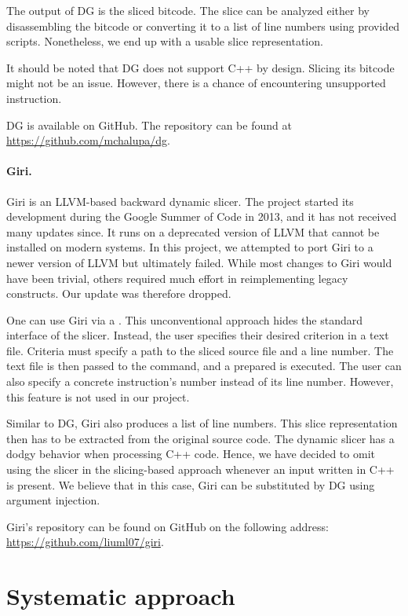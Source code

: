 The output of DG is the sliced bitcode. 
The slice can be analyzed either by disassembling the bitcode or converting 
it to a list of line numbers using provided scripts. 
Nonetheless, we end up with a usable slice representation.

It should be noted that DG does not support C++ by design. 
Slicing its bitcode might not be an issue. 
However, there is a chance of encountering unsupported instruction.

DG is available on GitHub. 
The repository can be found at \url{https://github.com/mchalupa/dg}.

\paragraph{Giri.}

Giri is an LLVM-based backward dynamic slicer. 
The project started its development during the Google Summer of Code in 2013, 
and it has not received many updates since. 
It runs on a deprecated version of LLVM that cannot be installed on modern 
systems. 
In this project, we attempted to port Giri to a newer version of LLVM but 
ultimately failed. 
While most changes to Giri would have been trivial, others required much 
effort in reimplementing legacy constructs. 
Our update was therefore dropped.

One can use Giri via a . 
This unconventional approach hides the standard interface of the slicer. 
Instead, the user specifies their desired criterion in a text file. 
Criteria must specify a path to the sliced source file and a line number. 
The text file is then passed to the  command, and a prepared 
 is executed. 
The user can also specify a concrete instruction's number instead of its 
line number. 
However, this feature is not used in our project.

Similar to DG, Giri also produces a list of line numbers. 
This slice representation then has to be extracted from the original source 
code.
The dynamic slicer has a dodgy behavior when processing C++ code. 
Hence, we have decided to omit using the slicer in the slicing-based approach 
whenever an input written in C++ is present. 
We believe that in this case, Giri can be substituted by DG using argument 
injection.

Giri's repository can be found on GitHub on the following address: 
\url{https://github.com/liuml07/giri}.

\section{Systematic approach}

